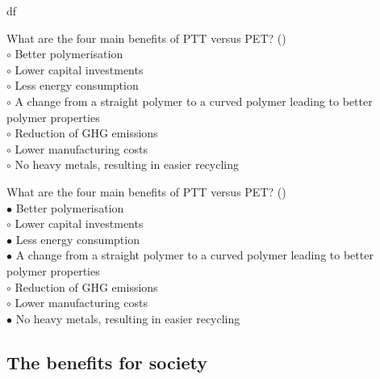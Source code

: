 df\documentclass[]{beamer}
\begin{document}
\begin{CJK}{UTF8}{gbsn}
\begin{frame}[shrink] {}
\addtocounter{questions}{1}
\color{blue}
What are the four main benefits of PTT versus PET?
({})\\
\color{black}
\setlength{\parindent}{-0.4cm}
{\color{red}$\circ$}  Better polymerisation   \\
{\color{red}$\circ$} Lower capital investments  \\
{\color{red}$\circ$}  Less energy consumption  \\
{\color{red}$\circ$}  A change from a straight polymer to a curved polymer leading to better polymer properties  \\
{\color{red}$\circ$} Reduction of GHG emissions  \\
{\color{red}$\circ$} Lower manufacturing costs  \\
{\color{red}$\circ$}  No heavy metals, resulting in easier recycling  \\

\end{frame}
\begin{frame}[shrink] {}
\addtocounter{answers}{1}
\color{blue}
What are the four main benefits of PTT versus PET?
({})\\
\color{black}
\setlength{\parindent}{-0.4cm}
{\color{red}$\bullet$} Better polymerisation   \\
{\color{red}$\circ$} Lower capital investments  \\
{\color{red}$\bullet$} Less energy consumption  \\
{\color{red}$\bullet$} A change from a straight polymer to a curved polymer leading to better polymer properties  \\
{\color{red}$\circ$} Reduction of GHG emissions  \\
{\color{red}$\circ$} Lower manufacturing costs  \\
{\color{red}$\bullet$} No heavy metals, resulting in easier recycling  \\

\end{frame}


\subsection{The benefits for society}
\setcounter{questions}{0}
\setcounter{answers}{0}



\end{CJK}
\end{document}
